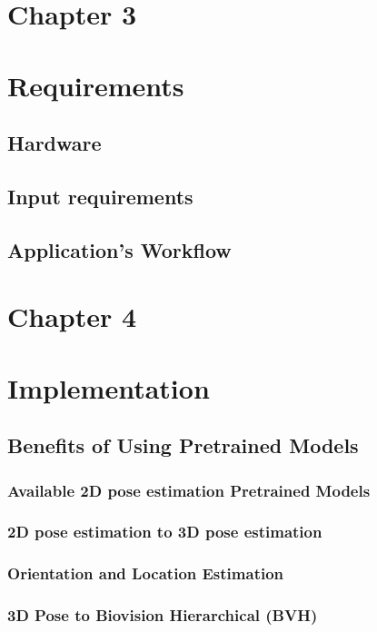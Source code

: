 \documentclass[12pt,oneside,a4paper,english]{article}
\begin{document}
\newpage
\section*{Chapter 3 \\}
\section{Requirements}
\subsection{Hardware}

\subsection{Input requirements}

\subsection{Application's Workflow}


\newpage
\section*{Chapter 4 \\}
\section{Implementation}

\subsection{Benefits of Using Pretrained Models}

\subsubsection{Available 2D pose estimation Pretrained Models}

\subsubsection{2D pose estimation to 3D pose estimation}

\subsubsection{Orientation and Location Estimation}

\subsubsection{3D Pose to Biovision Hierarchical (BVH)}

\end{document}
